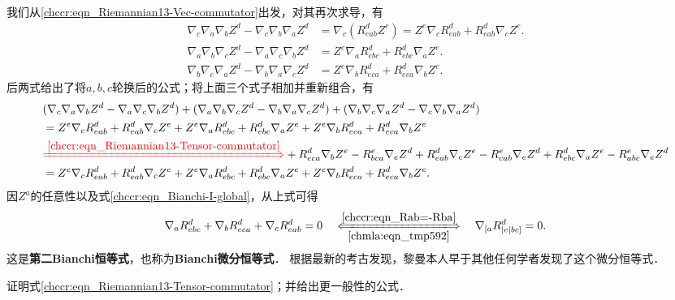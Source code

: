 我们从\eqref{chccr:eqn_Riemannian13-Vec-commutator}出发，对其再次求导，有
\begin{align*}
    \nabla_c\nabla_a \nabla_b Z^d - \nabla_c\nabla_b \nabla_a Z^d &=\nabla_c (R_{eab}^d Z^e)
    =Z^e \nabla_c R_{eab}^d + R_{eab}^d \nabla_c Z^e . \\
    \nabla_a\nabla_b \nabla_c Z^d - \nabla_a\nabla_c \nabla_b Z^d &=Z^e \nabla_a R_{ebc}^d + R_{ebc}^d \nabla_a Z^e .\\
    \nabla_b\nabla_c \nabla_a Z^d - \nabla_b\nabla_a \nabla_c Z^d &=Z^e \nabla_b R_{eca}^d + R_{eca}^d \nabla_b Z^e .
\end{align*}
后两式给出了将$a,b,c$轮换后的公式；将上面三个式子相加并重新组合，有
\setlength{\mathindent}{0em}
\begin{align*}
   &(\nabla_c\nabla_a \nabla_b Z^d - \nabla_a\nabla_c \nabla_b Z^d)+
    (\nabla_a\nabla_b \nabla_c Z^d - \nabla_b\nabla_a \nabla_c Z^d) +
    (\nabla_b\nabla_c \nabla_a Z^d - \nabla_c\nabla_b \nabla_a Z^d)  \\
   &= Z^e \nabla_c R_{eab}^d + R_{eab}^d \nabla_c Z^e  +
      Z^e \nabla_a R_{ebc}^d + R_{ebc}^d \nabla_a Z^e +
      Z^e \nabla_b R_{eca}^d + R_{eca}^d \nabla_b Z^e \\
   &{\color{red} \xLongrightarrow{\ref{chccr:eqn_Riemannian13-Tensor-commutator}}}
      +R_{eca}^d \nabla_b Z^e  -R_{bca}^e \nabla_e Z^d
      +R_{eab}^d \nabla_c Z^e  -R_{cab}^e \nabla_e Z^d
      +R_{ebc}^d \nabla_a Z^e  -R_{abc}^e \nabla_e Z^d \\
   &= Z^e \nabla_c R_{eab}^d + R_{eab}^d \nabla_c Z^e  +
      Z^e \nabla_a R_{ebc}^d + R_{ebc}^d \nabla_a Z^e +
      Z^e \nabla_b R_{eca}^d + R_{eca}^d \nabla_b Z^e .
\end{align*}\setlength{\mathindent}{2em}
因$Z^a$的任意性以及式\eqref{chccr:eqn_Bianchi-I-global}，从上式可得
\begin{equation}\label{chccr:eqn_Bianchi-II-global}
    \nabla_a R_{ebc}^d + \nabla_b R_{eca}^d + \nabla_c R_{eab}^d = 0 \quad
    \xLongleftrightarrow[\ref{chmla:eqn_tmp592}]{\ref{chccr:eqn_Rab=-Rba}}\quad
    \nabla_{[a} R_{|e|bc]}^d = 0.
\end{equation}
这是{\heiti\bfseries 第二Bianchi恒等式}，也称为{\heiti\bfseries Bianchi微分恒等式}．
根据最新的考古\cite{Darrigol-2015}发现，黎曼本人早于其他任何学者发现了这个微分恒等式．


\begin{exercise}
	证明式\eqref{chccr:eqn_Riemannian13-Tensor-commutator}；并给出更一般性的公式．
\end{exercise}

